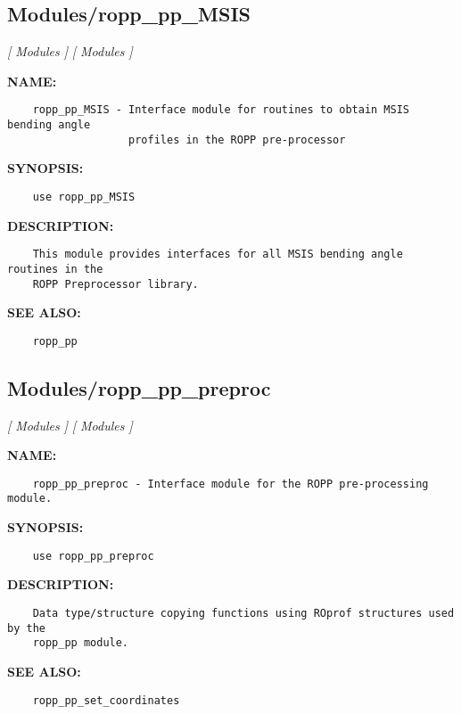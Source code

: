 \subsection{Modules/ropp\_pp\_MSIS}
\textsl{[ Modules ]}
\textsl{[ Modules ]}

\label{ch:robo45}
\label{ch:Modules_ropp_pp_MSIS}
\textbf{NAME:}\hspace{0.08in}\begin{Verbatim}
    ropp_pp_MSIS - Interface module for routines to obtain MSIS bending angle
                   profiles in the ROPP pre-processor
\end{Verbatim}
\textbf{SYNOPSIS:}\hspace{0.08in}\begin{Verbatim}
    use ropp_pp_MSIS
\end{Verbatim}
\textbf{DESCRIPTION:}\hspace{0.08in}\begin{Verbatim}
    This module provides interfaces for all MSIS bending angle routines in the
    ROPP Preprocessor library.
\end{Verbatim}
\textbf{SEE ALSO:}\hspace{0.08in}\begin{Verbatim}
    ropp_pp
\end{Verbatim}
\subsection{Modules/ropp\_pp\_preproc}
\textsl{[ Modules ]}
\textsl{[ Modules ]}

\label{ch:robo46}
\label{ch:Modules_ropp_pp_preproc}
\textbf{NAME:}\hspace{0.08in}\begin{Verbatim}
    ropp_pp_preproc - Interface module for the ROPP pre-processing module.
\end{Verbatim}
\textbf{SYNOPSIS:}\hspace{0.08in}\begin{Verbatim}
    use ropp_pp_preproc
\end{Verbatim}
\textbf{DESCRIPTION:}\hspace{0.08in}\begin{Verbatim}
    Data type/structure copying functions using ROprof structures used by the
    ropp_pp module.
\end{Verbatim}
\textbf{SEE ALSO:}\hspace{0.08in}\begin{Verbatim}
    ropp_pp_set_coordinates
\end{Verbatim}
